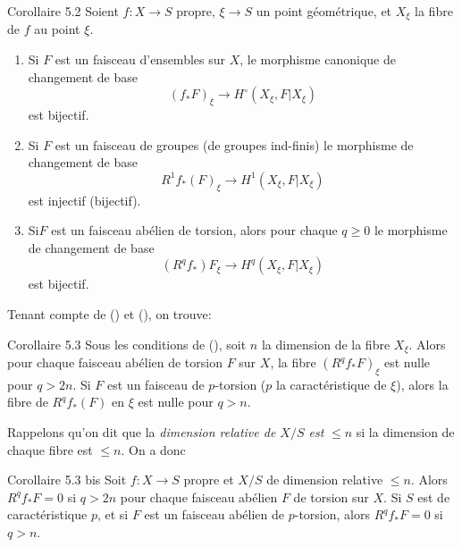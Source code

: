 \documentclass[10pt]{../fichiers-configuration-latex/smfart}
\begin{document}
\begin{enonce*}{Corollaire 5.2}
Soient $f:X\rightarrow S$ propre, $\xi\rightarrow S$ un point
géométrique, et $X_{\xi}$ la fibre de $f$ au point $\xi$.
\begin{enumerate}
\renewcommand{\theenumi}{\roman{enumi}}
\renewcommand{\labelenumi}{(\theenumi)}
\item Si $F$ est un faisceau d'ensembles sur $X$, le morphisme
  canonique de changement de base
$$
(f_{\ast}F)_{\xi}\longrightarrow H^{\circ}(X_{\xi},F| X_{\xi})
$$
est bijectif.

\item Si $F$ est un faisceau de groupes (\resp de groupes ind-finis)
  le morphisme de changement de base
$$
R^1f_{\ast}(F)_{\xi}\longrightarrow H^1(X_{\xi},F| X_{\xi})
$$
est injectif (\resp bijectif).

\item Si\pageoriginale $F$ est un faisceau abélien de torsion, alors
  pour chaque $q\geq 0$ le morphisme de changement de base
$$
(R^qf_{\ast})F_{\xi}\longrightarrow H^q(X_{\xi},F| X_{\xi})
$$
est bijectif.
\end{enumerate}
\end{enonce*}

Tenant compte de () et (), on trouve:

\begin{enonce*}{Corollaire 5.3}
Sous les conditions de (), soit $n$ la dimension de la fibre
$X_{\xi}$. Alors pour chaque faisceau abélien de torsion $F$ sur $X$,
la fibre $(R^qf_{\ast}F)_{\xi}$ est nulle pour $q>2n$. Si $F$ est un
faisceau de $p$-torsion ($p$ la caractéristique de $\xi$), alors la
fibre de $R^qf_{\ast}(F)$ en $\xi$ est nulle pour $q>n$.
\end{enonce*}

Rappelons qu'on dit que la \emph{dimension relative de $X/S$ est}
$\leq n$ si la dimension de chaque fibre est $\leq n$. On a donc

\begin{enonce*}{Corollaire 5.3 bis}
Soit $f:X\rightarrow S$ propre et $X/S$ de dimension relative $\leq
n$. Alors $R^qf_{\ast}F=0$ si $q>2n$ pour chaque faisceau abélien $F$
de torsion sur $X$. Si $S$ est de caractéristique $p$, et si $F$ est
un faisceau abélien de $p$-torsion, alors $R^qf_{\ast}F=0$ si $q>n$.
\end{enonce*}
\end{document}
